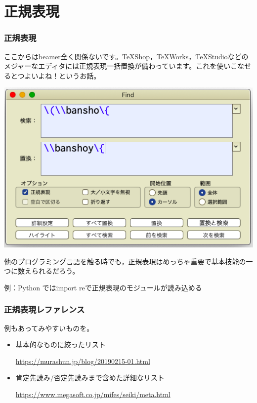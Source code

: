 \documentclass[10pt,dvipdfmx]{beamer}
\begin{document}
\section{正規表現}
\begin{frame}[t]
 \frametitle{正規表現}

ここからはbeamer全く関係ないです。TeXShop，TeXWorks，TeXStudioなどのメジャーなエディタには正規表現一括置換が備わっています。これを使いこなせるとつよいよね！というお話。

\includegraphics[width=0.6\linewidth]{TeXShop一括置換画面.png}

他のプログラミング言語を触る時でも，\alert{正規表現はめっちゃ重要で基本技能の一つ}に数えられるだろう。

\quad 例：Python ではimport reで正規表現のモジュールが読み込める
\end{frame}

\begin{frame}[t]
 \frametitle{正規表現レファレンス}
 
例もあってみやすいものを。

\begin{itemize}
\item 基本的なものに絞ったリスト

\url{https://murashun.jp/blog/20190215-01.html}

\item 肯定先読み/否定先読みまで含めた詳細なリスト

\url{https://www.megasoft.co.jp/mifes/seiki/meta.html}
\end{itemize}

\end{frame}
\end{document}
